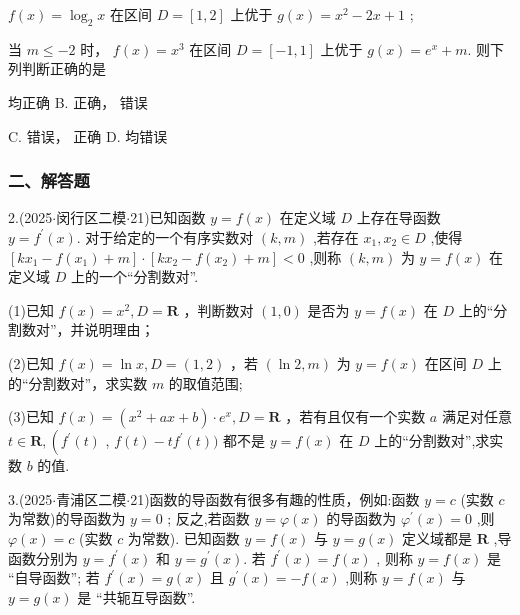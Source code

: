    $f\left( x\right)  = {\log }_{2}x$ 在区间 $D = \left\lbrack  {1,2}\right\rbrack$ 上优于 $g\left( x\right)  = {x}^{2} - {2x} + 1$ ;

   当 $m \leq   - 2$ 时， $f\left( x\right)  = {x}^{3}$ 在区间 $D = \left\lbrack  {-1,1}\right\rbrack$ 上优于 $g\left( x\right)  = {{e}}^{x} + m$. 则下列判断正确的是 \dotfill{(\kh{})}

\xx{}{}{}{}    均正确 B.   正确，  错误

C.   错误，  正确 D.     均错误

\subsubsection*{二、解答题}

2.(2025$\cdot$闵行区二模$\cdot$21)已知函数 $y = f\left( x\right)$ 在定义域 $D$ 上存在导函数 $y = {f}^{\prime }\left( x\right)$. 对于给定的一个有序实数对 $\left( {k,m}\right)$ ,若存在 ${x}_{1},{x}_{2} \in  D$ ,使得 $\left\lbrack  {k{x}_{1} - f\left( {x}_{1}\right)  + m}\right\rbrack   \cdot  \left\lbrack  {k{x}_{2} - f\left( {x}_{2}\right)  + m}\right\rbrack   < 0$ ,则称 $\left( {k,m}\right)$ 为 $y = f\left( x\right)$ 在定义域 $D$ 上的一个“分割数对”.

(1)已知 $f\left( x\right)  = {x}^{2},D = \mathbf{R}$ ，判断数对 $\left( {1,0}\right)$ 是否为 $y = f\left( x\right)$ 在 $D$ 上的“分割数对”，并说明理由；

(2)已知 $f\left( x\right)  = \ln x,D = \left( {1,2}\right)$ ，若 $\left( {\ln 2,m}\right)$ 为 $y = f\left( x\right)$ 在区间 $D$ 上的“分割数对”，求实数 $m$ 的取值范围;

(3)已知 $f\left( x\right)  = \left( {{x}^{2} + {ax} + b}\right)  \cdot  {{e}}^{x},D = \mathbf{R}$ ，若有且仅有一个实数 $a$ 满足对任意 $t \in  \mathbf{R},\left( {{f}^{\prime }\left( t\right) }\right.$ , $f\left( t\right)  - t{f}^{\prime }\left( t\right) )$ 都不是 $y = f\left( x\right)$ 在 $D$ 上的“分割数对”,求实数 $b$ 的值.

3.(2025$\cdot$青浦区二模$\cdot$21)函数的导函数有很多有趣的性质，例如:函数 $y = c$ (实数 $c$ 为常数)的导函数为 $y = 0$ ; 反之,若函数 $y = \varphi \left( x\right)$ 的导函数为 ${\varphi }^{\prime }\left( x\right)  = 0$ ,则 $\varphi \left( x\right)  = c$ (实数 $c$ 为常数). 已知函数 $y = f\left( x\right)$ 与 $y = g\left( x\right)$ 定义域都是 $\mathbf{R}$ ,导函数分别为 $y = {f}^{\prime }\left( x\right)$ 和 $y = {g}^{\prime }\left( x\right)$. 若 ${f}^{\prime }\left( x\right)  = f\left( x\right)$ , 则称 $y = f\left( x\right)$ 是 “自导函数”; 若 ${f}^{\prime }\left( x\right)  = g\left( x\right)$ 且 ${g}^{\prime }\left( x\right)  =  - f\left( x\right)$ ,则称 $y = f\left( x\right)$ 与 $y = g\left( x\right)$ 是 “共轭互导函数”.

